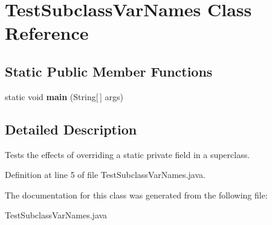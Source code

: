 \section{Test\-Subclass\-Var\-Names Class Reference}
\label{classTestSubclassVarNames}
\subsection*{Static Public Member Functions}
\begin{CompactItemize}
\item 
static void {\bf main} (String[$\,$] args)\label{classTestSubclassVarNames_18405b106d2c2233e90a75e5fe7f930e}

\end{CompactItemize}


\subsection{Detailed Description}
Tests the effects of overriding a static private field in a superclass. 



Definition at line 5 of file Test\-Subclass\-Var\-Names.java.

The documentation for this class was generated from the following file:\begin{CompactItemize}
\item 
Test\-Subclass\-Var\-Names.java\end{CompactItemize}
